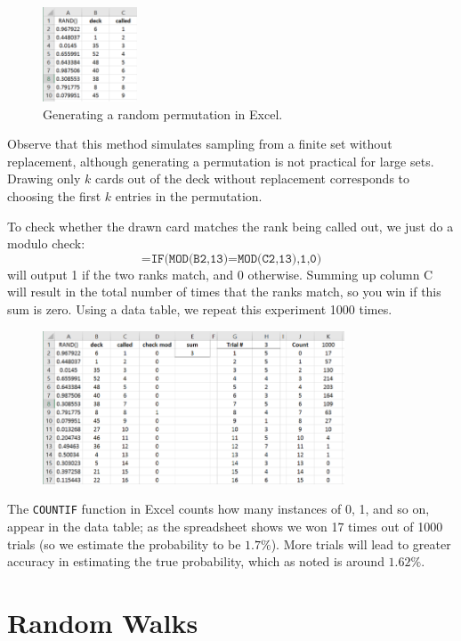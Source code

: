 \begin{figure}[htbp]
	\centering
	\includegraphics[width=0.25\textwidth]{fig/3_deck_1.png}
	\caption{Generating a random permutation in Excel. \label{fig:3_deck_1}}
\end{figure}

Observe that this method simulates sampling from a finite set without replacement, although generating a permutation is not practical for large sets.
Drawing only $k$ cards out of the deck without replacement corresponds to choosing the first $k$ entries in the permutation.

To check whether the drawn card matches the rank being called out, we just do a modulo check: \[ \texttt{=IF(MOD(B2,13)=MOD(C2,13),1,0)} \] will output 1 if the two ranks match, and 0 otherwise.
Summing up column C will result in the total number of times that the ranks match, so you win if this sum is zero.
Using a data table, we repeat this experiment 1000 times.


\begin{figure}[htbp]
	\centering
	\includegraphics[width=0.8\textwidth]{fig/3_deck_2.png}
	\label{fig:3_deck_2}
\end{figure}

The \texttt{COUNTIF} function in Excel counts how many instances of 0, 1, and so on, appear in the data table; as the spreadsheet shows we won 17 times out of 1000 trials (so we estimate the probability to be $1.7\%$).
More trials will lead to greater accuracy in estimating the true probability, which as noted is around $1.62\%$.

\section{Random Walks}

